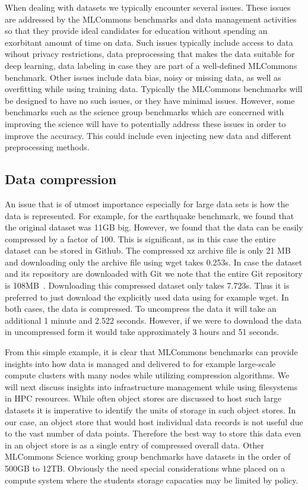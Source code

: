 \documentclass[utf8]{FrontiersinVancouver} %
\begin{document}
When dealing with datasets we typically encounter several issues.
These issues are addressed by the MLCommons benchmarks and
data management activities so that they provide ideal candidates for
education without spending an exorbitant amount of time on data. Such
issues typically include access to data wihout privacy restrictions,
data preprocessing that makes the data suitable for deep learning,
data labeling in case they are part of a well-defined MLCommons
benchmark. Other issues include data bias, noisy or missing data, as
well as overfitting while using training data. Typically the MLCommons
benchmarks will be designed to have no such issues, or they have
minimal issues. However, some benchmarks such as the science group
benchmarks which are concerned with improving the science will have to
potentially address these issues in order to improve the accuracy. This
could include even injecting new data and different preprocessing
methods.


\subsection{Data compression}

An issue that is of utmost importance especially for large data sets
is how the data is represented. For example, for the earthquake
benchmark, we found that the original dataset was 11GB big. However,
we found that the data can be easily compressed by a factor of
100. This is significant, as in this case the entire dataset can be
stored in Github. The compressed xz archive file is only 21 MB and
downloading only the archive file using wget takes 0.253s. In case the
dataset and its repository are downloaded with Git we note that the
entire Git repository is
108MB~\citep{mlcommons-earthquake-data}. Downloading this compressed
dataset only takes 7.723s. Thus it is preferred to just download the
explicitly used data using for example wget. In both cases, the data
is compressed. To uncompress the data it will take an additional 1
minute and 2.522 seconds. However, if we were to download the data in
uncompressed form it would take approximately 3 hours and 51 seconds.

From this simple example, it is clear that MLCommons benchmarks can
provide insights into how data is managed and delivered to for example
large-scale compute clusters with many nodes while utilizing
compression algorithms. We will next discuss insights into
infrastructure management while using filesystems in HPC resources.
While often object stores are discussed to host such large datasets it
is imperative to identify the units of storage in such object stores.
In our case, an object store that would host individual data records
is not useful due to the vast number of data points. Therefore the
best way to store this data even in an object store is as a single
entry of compressed overall data.  Other MLCommons Science working
group benchmarks have datasets in the order of 500GB to
12TB. Obviously the need special considerations whne placed on a
compute system where the students storage capacaties may be limited by
policy.
\end{document}
